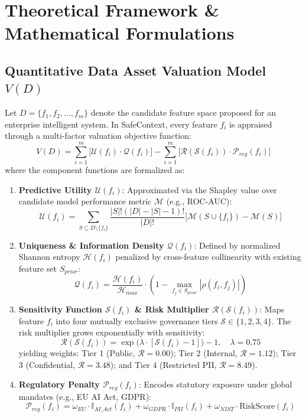 \documentclass[journal]{IEEEtran}
\begin{document}
\section{Theoretical Framework \& Mathematical Formulations}

\subsection{Quantitative Data Asset Valuation Model $V(D)$}
Let $D = \{f_1, f_2, \dots, f_m\}$ denote the candidate feature space proposed for an enterprise intelligent system. In SafeContext, every feature $f_i$ is appraised through a multi-factor valuation objective function:
\begin{equation}
V(D) = \sum_{i=1}^{m} \Big[ \mathcal{U}(f_i) \cdot \mathcal{Q}(f_i) \Big] - \sum_{i=1}^{m} \Big[ \mathcal{R}(\mathcal{S}(f_i)) \cdot \mathcal{P}_{reg}(f_i) \Big]
\label{eq:valuation}
\end{equation}
where the component functions are formalized as:
\begin{enumerate}
    \item \textbf{Predictive Utility $\mathcal{U}(f_i)$}: Approximated via the Shapley value over candidate model performance metric $\mathcal{M}$ (e.g., ROC-AUC):
    \begin{equation}
    \mathcal{U}(f_i) = \sum_{S \subseteq D \setminus \{f_i\}} \frac{|S|!(|D| - |S| - 1)!}{|D|!} \Big[ \mathcal{M}(S \cup \{f_i\}) - \mathcal{M}(S) \Big]
    \end{equation}
    \item \textbf{Uniqueness \& Information Density $\mathcal{Q}(f_i)$}: Defined by normalized Shannon entropy $\mathcal{H}(f_i)$ penalized by cross-feature collinearity with existing feature set $S_{prior}$:
    \begin{equation}
    \mathcal{Q}(f_i) = \frac{\mathcal{H}(f_i)}{\mathcal{H}_{max}} \cdot \left( 1 - \max_{f_j \in S_{prior}} |\rho(f_i, f_j)| \right)
    \end{equation}
    \item \textbf{Sensitivity Function $\mathcal{S}(f_i)$ \& Risk Multiplier $\mathcal{R}(\mathcal{S}(f_i))$}: Maps feature $f_i$ into four mutually exclusive governance tiers $\mathcal{S} \in \{1, 2, 3, 4\}$. The risk multiplier grows exponentially with sensitivity:
    \begin{equation}
    \mathcal{R}(\mathcal{S}(f_i)) = \exp\Big( \lambda \cdot [\mathcal{S}(f_i) - 1] \Big) - 1, \quad \lambda = 0.75
    \end{equation}
    yielding weights: Tier 1 (Public, $\mathcal{R}=0.00$); Tier 2 (Internal, $\mathcal{R}=1.12$); Tier 3 (Confidential, $\mathcal{R}=3.48$); and Tier 4 (Restricted PII, $\mathcal{R}=8.49$).
    \item \textbf{Regulatory Penalty $\mathcal{P}_{reg}(f_i)$}: Encodes statutory exposure under global mandates (e.g., EU AI Act, GDPR):
    \begin{equation}
    \mathcal{P}_{reg}(f_i) = \omega_{EU} \cdot \mathbb{I}_{AI\_Act}(f_i) + \omega_{GDPR} \cdot \mathbb{I}_{PII}(f_i) + \omega_{NIST} \cdot \text{RiskScore}(f_i)
    \end{equation}
\end{enumerate}
\end{document}

